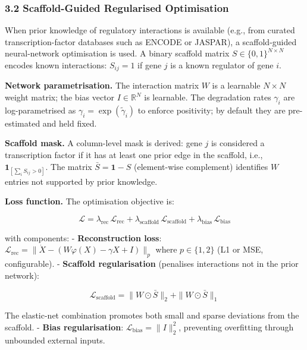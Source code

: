 \documentclass[11pt]{article}
\begin{document}
\subsubsection*{3.2 Scaffold-Guided Regularised Optimisation}

When prior knowledge of regulatory interactions is available (e.g., from curated transcription-factor databases such as ENCODE or JASPAR), a scaffold-guided neural-network optimisation is used. A binary scaffold matrix $S \in \{0,1\}^{N \times N}$ encodes known interactions: $S_{ij} = 1$ if gene $j$ is a known regulator of gene $i$.

\textbf{Network parametrisation.} The interaction matrix $W$ is a learnable $N \times N$ weight matrix; the bias vector $I \in \mathbb{R}^N$ is learnable. The degradation rates $\gamma_i$ are log-parametrised as $\gamma_i = \exp(\tilde{\gamma}_i)$ to enforce positivity; by default they are pre-estimated and held fixed.

\textbf{Scaffold mask.} A column-level mask is derived: gene $j$ is considered a transcription factor if it has at least one prior edge in the scaffold, i.e., $\mathbf{1}_{[\sum_i S_{ij} > 0]}$. The matrix $\bar{S} = \mathbf{1} - S$ (element-wise complement) identifies $W$ entries not supported by prior knowledge.

\textbf{Loss function.} The optimisation objective is:


\begin{equation}
\mathcal{L} = \lambda_{\text{rec}}\,\mathcal{L}_{\text{rec}} + \lambda_{\text{scaffold}}\,\mathcal{L}_{\text{scaffold}} + \lambda_{\text{bias}}\,\mathcal{L}_{\text{bias}} 
\end{equation}


with components:
- \textbf{Reconstruction loss}: $\mathcal{L}_{\text{rec}} = \|\dot{X} - (W\varphi(X) - \gamma X + I)\|_p$ where $p \in \{1, 2\}$ (L1 or MSE, configurable).
- \textbf{Scaffold regularisation} (penalises interactions not in the prior network):

\begin{equation}
\mathcal{L}_{\text{scaffold}} = \|W \odot \bar{S}\|_2 + \|W \odot \bar{S}\|_1 
\end{equation}

The elastic-net combination promotes both small and sparse deviations from the scaffold.
- \textbf{Bias regularisation}: $\mathcal{L}_{\text{bias}} = \|I\|_2^2$, preventing overfitting through unbounded external inputs.
\end{document}
